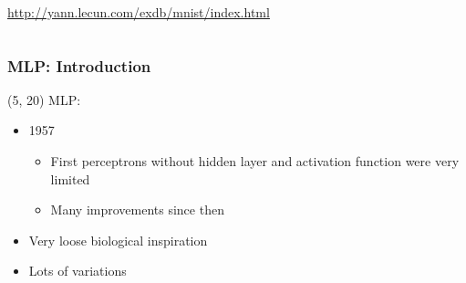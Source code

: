 \begin{frame}
\begin{columns}
\begin{column}{0.5\textwidth}
      \url{http://yann.lecun.com/exdb/mnist/index.html}
    \end{column}
  \end{columns}
\end{frame}

\begin{frame}
  \frametitle{\acl{MLP}: Introduction}

  \begin{textblock}{80}(5, 20)
    \acl{MLP}:
    \begin{itemize}
    \item<1-> 1957
      \begin{itemize}
      \item First perceptrons without hidden layer and activation function were
        very limited
      \item Many improvements since then
      \end{itemize}
    \item<1-> Very loose biological inspiration
    \item<1-> Lots of variations
    \end{itemize}
  \end{textblock}
\end{frame}

